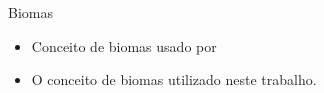 \begin{frame}{Biomas}
    \begin{itemize} \setlength\itemsep{1em}
        \item Conceito de biomas usado por \cite{walter1986vegetaccao}
        \item O conceito de biomas utilizado neste trabalho.
    \end{itemize}
    
\end{frame}